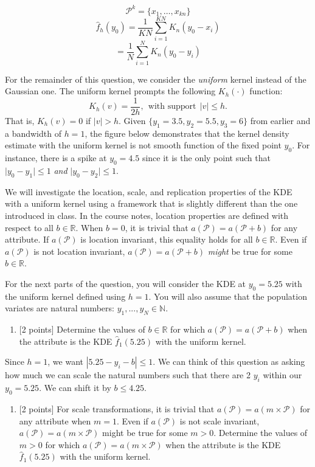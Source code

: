 \documentclass[
]{article}
\providecommand{\tightlist}{%
  \setlength{\itemsep}{0pt}\setlength{\parskip}{0pt}}
\begin{document}
\[
\mathcal P^k = \{x_1, \dots, x_{kn}\}
\] \[
\hat f_{h}(y_0) = \frac{1}{KN}\sum_{i=1}^{KN}K_n(y_0 - x_i)
\] \[
=\frac{1}{N} \sum_{i=1}^{N}K_n(y_0 - y_i)
\]

For the remainder of this question, we consider the \emph{uniform}
kernel instead of the Gaussian one. The uniform kernel prompts the
following \(K_h(\cdot)\) function:
\[K_h(v) = \dfrac{1}{2h}, ~~ \text{with support}~~ \lvert v \rvert \le h.\]
That is, \(K_h(v) = 0\) if \(\lvert v \rvert > h\). Given
\(\{y_1 = 3.5, y_2 = 5.5, y_3 = 6\}\) from earlier and a bandwidth of
\(h = 1\), the figure below demonstrates that the kernel density
estimate with the uniform kernel is not smooth function of the fixed
point \(y_0\). For instance, there is a spike at \(y_0 = 4.5\) since it
is the only point such that \(\lvert y_0 - y_1 \rvert \le 1\) \emph{and}
\(\lvert y_0 - y_2 \rvert \le 1\).

We will investigate the location, scale, and replication properties of
the KDE with a uniform kernel using a framework that is slightly
different than the one introduced in class. In the course notes,
location properties are defined with respect to all
\(b \in \mathbb{R}\). When \(b = 0\), it is trivial that
\(a(\mathcal{P}) = a(\mathcal{P} + b)\) for any attribute. If
\(a(\mathcal{P})\) is location invariant, this equality holds for all
\(b \in \mathbb{R}\). Even if \(a(\mathcal{P})\) is not location
invariant, \(a(\mathcal{P}) = a(\mathcal{P} + b)\) \emph{might} be true
for some \(b \in \mathbb{R}\).

For the next parts of the question, you will consider the KDE at
\(y_0 = 5.25\) with the uniform kernel defined using \(h = 1\). You will
also assume that the population variates are natural numbers:
\(y_1, ..., y_N \in \mathbb{N}\).

\begin{enumerate}
\def\labelenumi{(\alph{enumi})}
\setcounter{enumi}{3}
\tightlist
\item
  {[}2 points{]} Determine the values of \(b \in \mathbb{R}\) for which
  \(a(\mathcal{P}) = a(\mathcal{P} + b)\) when the attribute is the KDE
  \(\hat{f}_1(5.25)\) with the uniform kernel.
\end{enumerate}

Since \(h = 1\), we want \(|5.25 - y_{i} - b| \leq 1\). We can think of
this question as asking how much we can scale the natural numbers such
that there are 2 \(y_i\) within our \(y_0 = 5.25\). We can shift it by
\(b \leq 4.25\).

\begin{enumerate}
\def\labelenumi{(\alph{enumi})}
\setcounter{enumi}{4}
\tightlist
\item
  {[}2 points{]} For scale transformations, it is trivial that
  \(a(\mathcal{P}) = a(m\times \mathcal{P})\) for any attribute when
  \(m = 1\). Even if \(a(\mathcal{P})\) is not scale invariant,
  \(a(\mathcal{P}) =a(m\times \mathcal{P})\) might be true for some
  \(m > 0\). Determine the values of \(m > 0\) for which
  \(a(\mathcal{P}) =a(m\times \mathcal{P})\) when the attribute is the
  KDE \(\hat{f}_1(5.25)\) with the uniform kernel.
\end{enumerate}
\end{document}
